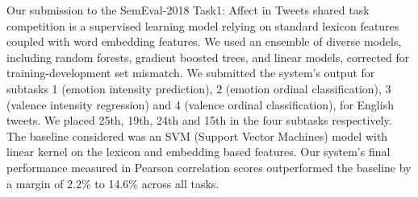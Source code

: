 Our submission to the SemEval-2018 Task1: Affect in Tweets shared task competition is a supervised learning model relying on standard lexicon features coupled with word embedding features. We used an ensemble of diverse models, including random forests, gradient boosted trees, and linear models, corrected for training-development set mismatch. We submitted the system's output for subtasks 1 (emotion intensity prediction), 2 (emotion ordinal classification), 3 (valence intensity regression) and 4 (valence ordinal classification), for English tweets. We placed 25th, 19th, 24th and 15th in the four subtasks respectively. The baseline considered was an SVM (Support Vector Machines) model with linear kernel on the lexicon and embedding based features. Our system's final performance measured in Pearson correlation scores outperformed the baseline by a margin of 2.2\% to 14.6\% across all tasks.

